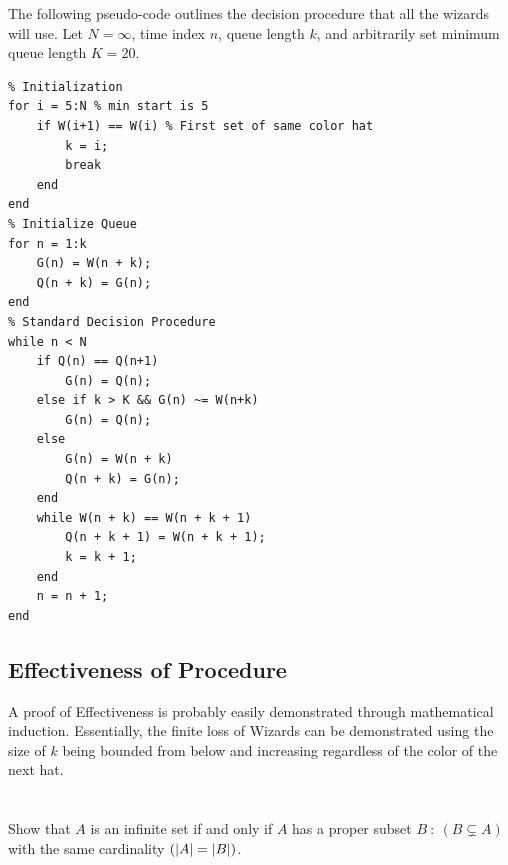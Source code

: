 \documentclass[]{article}
\begin{document}
\newpage
The following pseudo-code outlines the decision procedure that all the wizards will use. 
Let $N=\infty$, time index $n$, queue length $k$, and arbitrarily set minimum queue length $K = 20$.
\begin{lstlisting}
% Initialization
for i = 5:N % min start is 5
    if W(i+1) == W(i) % First set of same color hat
        k = i;
        break
    end
end
% Initialize Queue
for n = 1:k
    G(n) = W(n + k);
    Q(n + k) = G(n);
end
% Standard Decision Procedure
while n < N
    if Q(n) == Q(n+1)
        G(n) = Q(n);
    else if k > K && G(n) ~= W(n+k)
        G(n) = Q(n);
    else
        G(n) = W(n + k)
        Q(n + k) = G(n);
    end
    while W(n + k) == W(n + k + 1)
        Q(n + k + 1) = W(n + k + 1);
        k = k + 1;
    end
    n = n + 1;
end
\end{lstlisting}


\subsection*{Effectiveness of Procedure}
A proof of Effectiveness is probably easily demonstrated through mathematical induction. 
Essentially, the finite loss of Wizards can be demonstrated using the size of $k$ 
being bounded from below and increasing regardless of the color of the next hat.





\newpage
\section{}
Show that $A$ is an infinite set if and only if $A$ has a proper subset 
$B \ : \ (B \subsetneq A)$ with the same cardinality $(\abs{A} = \abs{B})$.
\end{document}
